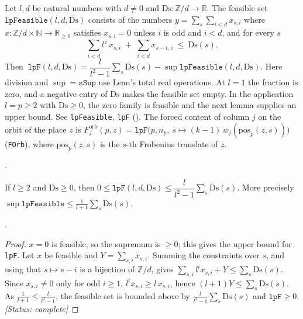 \begin{definition}\label{def:G-lpF}
Let $l,d$ be natural numbers with $d\ne0$ and $\mathrm{Ds}:\mathbb Z/d\to\mathbb R$. The feasible set
$\texttt{lpFeasible}(l,d,\mathrm{Ds})$ consists of the numbers $y=\sum_{s}\sum_{i<d}x_{s,i}$ where
$x:\mathbb Z/d\times\mathbb N\to\mathbb R_{\ge 0}$ satisfies $x_{s,i}=0$ unless $i$ is odd and $i<d$, and for every $s$
\[
  \sum_{i<d} l^{\,i}\,x_{s,i}\;+\;\sum_{i<d}x_{s-i,\,i}\ \le\ \mathrm{Ds}(s).
\]
Then $\ \texttt{lpF}(l,d,\mathrm{Ds})=\dfrac{l}{l^{2}-1}\sum_s \mathrm{Ds}(s)-\sup \texttt{lpFeasible}(l,d,\mathrm{Ds})$.
Here division and $\sup=\texttt{sSup}$ use Lean's total real operations. At $l=1$ the fraction is zero, and a negative entry of $\mathrm{Ds}$ makes the feasible set empty. In the application $l=p\ge2$ with $\mathrm{Ds}\ge0$, the zero family is feasible and the next lemma supplies an upper bound. See \texttt{lpFeasible}, \texttt{lpF} ().
The forced content of column $j$ on the orbit of the place $z$ is
$F^{\mathrm{orb}}_j(p,z)=\texttt{lpF}\bigl(p,n_p,\ s\mapsto (k-1)\,w_j(\mathrm{pos}_p(z,s))\bigr)$ (\texttt{FOrb}),
where $\mathrm{pos}_p(z,s)$ is the $s$-th Frobenius translate of $z$.
\par{\small {}.}\par
\end{definition}

\begin{lemma}\label{lem:G-lpF-bounds}
If $l\ge 2$ and $\mathrm{Ds}\ge 0$, then
$0\le \texttt{lpF}(l,d,\mathrm{Ds})\le \dfrac{l}{l^{2}-1}\sum_s\mathrm{Ds}(s)$. More precisely
$\sup\texttt{lpFeasible}\le \frac{1}{l+1}\sum_s\mathrm{Ds}(s)$.
\par{\small {}.}\par
\end{lemma}
\begin{proof}
$x=0$ is feasible, so the supremum is $\ge 0$; this gives the upper bound for \texttt{lpF}. Let $x$ be feasible
and $Y=\sum_{s,i}x_{s,i}$. Summing the constraints over $s$, and using that $s\mapsto s-i$ is a bijection of
$\mathbb Z/d$, gives $\sum_{s,i}l^{i}x_{s,i}+Y\le\sum_s\mathrm{Ds}(s)$. Since $x_{s,i}\ne 0$ only for odd
$i\ge 1$, $l^{i}x_{s,i}\ge l\,x_{s,i}$, hence $(l+1)Y\le \sum_s\mathrm{Ds}(s)$. As
$\frac1{l+1}\le\frac{l}{l^{2}-1}$, the feasible set is bounded above by $\frac{l}{l^2-1}\sum_s \mathrm{Ds}(s)$ and
$\texttt{lpF}\ge 0$. \textit{[Status: complete]}
\end{proof}

